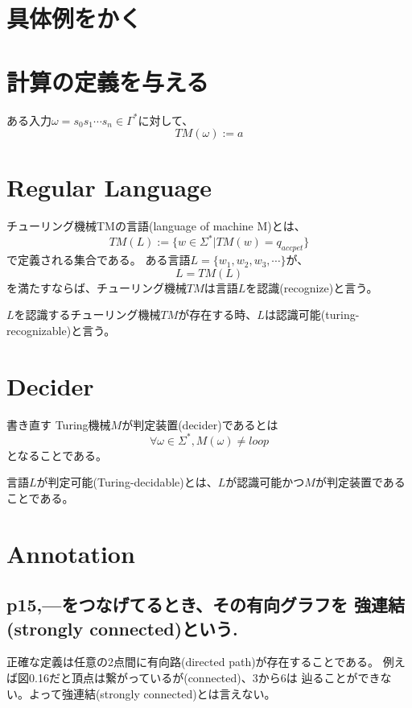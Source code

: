 \documentclass[b5paper,fleqn]{ltjsarticle}
\newcommand\s[1]{\subsection*{#1}\noindent\ignorespaces}
\begin{document}
\section{具体例をかく}
\section{計算の定義を与える}
ある入力$\omega=s_0s_1\cdots s_n\in\Gamma^*$に対して、
\[TM(\omega):=a\]
\section{Regular Language}
チューリング機械TMの言語(language of machine M)とは、
\[TM(L):=\{w\in \Sigma^*|TM(w)=q_{accpet}\}\]
で定義される集合である。
ある言語$L=\{w_1,w_2,w_3,\cdots\}$が、
\[L=TM(L)\]
を満たすならば、チューリング機械$TM$は言語$L$を認識(recognize)と言う。\par
$L$を認識するチューリング機械$TM$が存在する時、$L$は認識可能(turing-recognizable)と言う。
\section{Decider}
書き直す
Turing機械$M$が判定装置(decider)であるとは
\[\forall\omega\in\Sigma^*, M(\omega)\neq loop\]
となることである。\par
言語$L$が判定可能(Turing-decidable)とは、$L$が認識可能かつ$M$が判定装置であることである。

\section{Annotation}

\s{p15,---をつなげてるとき、その有向グラフを
強連結(strongly connected)という.}
正確な定義は任意の2点間に有向路(directed path)が存在することである。
例えば図0.16だと頂点は繋がっているが(connected)、3から6は
辿ることができない。よって強連結(strongly connected)とは言えない。
\end{document}
